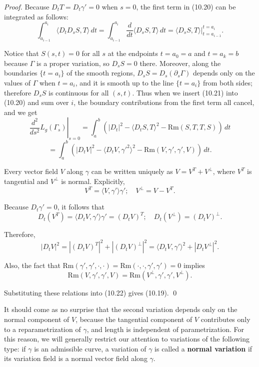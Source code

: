 \begin{theorem}
\begin{proof}
Because $D_t T = D_t \gamma' = 0$ when $s = 0$, the first term in (10.20) can be integrated
as follows:
\begin{equation}
\int_{a_{i-1}}^{a_i} \langle D_t D_s S, T \rangle \, dt = \int_{a_{i-1}}^{a_i} \frac{d}{dt} \langle D_s S, T \rangle \, dt = \left. \langle D_s S, T \rangle \right|_{t=a_{i-1}}^{t=a_i}. \tag{10.21}
\end{equation}

Notice that $S(s,t) = 0$ for all $s$ at the endpoints $t = a_0 = a$ and $t = a_k = b$ because
$\Gamma$ is a proper variation, so $D_s S = 0$ there. Moreover, along the boundaries $\{t = a_i\}$
of the smooth regions, $D_s S = D_s(\partial_s \Gamma)$ depends only on the values of $\Gamma$ when
$t = a_i$, and it is smooth up to the line $\{t = a_i\}$ from both sides; therefore $D_s S$ is
continuous for all $(s,t)$. Thus when we insert (10.21) into (10.20) and sum over $i$,
the boundary contributions from the first term all cancel, and we get
\[
\left. \frac{d^2}{ds^2} L_g(\Gamma_s) \right|_{s=0} = \int_a^b \left( |D_t |^2 - \langle D_t S, T \rangle^2 - \mathrm{Rm}(S, T, T, S) \right) \, dt
\]
\begin{equation}
= \int_a^b \left( |D_t V|^2 - \langle D_t V, \gamma'^2 \rangle^2 - \mathrm{Rm}(V, \gamma', \gamma', V) \right) \, dt. \tag{10.22}
\end{equation}

Every vector field $V$ along $\gamma$ can be written uniquely as $V = V^T + V^\perp$, where
$V^T$ is tangential and $V^\perp$ is normal. Explicitly,
\[
V^T = \langle V, \gamma' \rangle \gamma'; \quad V^\perp = V - V^T.
\]

Because $D_t \gamma' = 0$, it follows that
\[
D_t(V^T) = \langle D_t V, \gamma' \rangle \gamma' = (D_t V)^T; \quad D_t(V^\perp) = (D_t V)^\perp.
\]

Therefore,
\[
|D_t V|^2 = |(D_t V)^T|^2 + |(D_t V)^\perp|^2 = \langle D_t V, \gamma' \rangle^2 + |D_t V^\perp|^2.
\]

Also, the fact that $\mathrm{Rm}(\gamma', \gamma', \cdot, \cdot) = \mathrm{Rm}(\cdot, \cdot, \gamma', \gamma') = 0$ implies
\[
\mathrm{Rm}(V, \gamma', \gamma', V) = \mathrm{Rm}(V^\perp, \gamma', \gamma', V^\perp).
\]

Substituting these relations into (10.22) gives (10.19). \qed
\end{proof}
\end{theorem}

It should come as no surprise that the second variation depends only on the normal
component of $V$, because the tangential component of $V$ contributes only to a
reparametrization of $\gamma$, and length is independent of parametrization. For this reason, we will generally restrict our attention to variations of the following type: if $\gamma$
is an admissible curve, a variation of $\gamma$ is called a \textbf{normal variation} if its variation
field is a normal vector field along $\gamma$.

